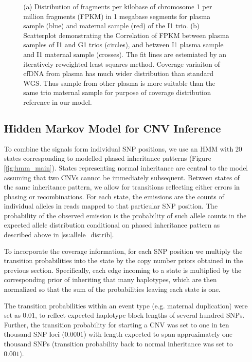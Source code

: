 \begin{figure}[h]
{\begin{minipage}[b]{0.45\textwidth}
	\end{minipage}	
}
	
\label{fig:fpkm}
\caption{(a) Distribution of fragments per kilobase of chromosome 1 per million fragments (FPKM) in 1 megabase segments for plasma sample (blue) and maternal sample (red) of the I1 trio. (b) Scatterplot demonstrating the Correlation of FPKM between plasma samples of I1 and G1 trios (circles), and between I1 plasma sample and I1 maternal sample (crosses). The fit lines are estemiated by an iteratively reweighted least squares method. Coverage variaiton of cfDNA from plasma has much wider distribution than standard WGS. Thus sample from other plasma is more suitable than the same trio maternal sample for purpose of coverage distribution reference in our model.  }\label{fig:fpkm}
\end{figure}

\subsection{Hidden Markov Model for CNV Inference}\label{ss:hmm}
To combine the signals form individual SNP positions, we use an HMM with 20 states corresponding to modelled phased inheritance patterns (Figure \ref{fig:hmm_main}). States representing normal inheritance are central to the model assuming that two CNVs cannot be immediately subsequent. Between states of the same inheritance pattern, we allow for transitions reflecting either errors in phasing or recombinations. For each state, the emissions are the counts of individual alleles in reads mapped to that particular SNP position. The probability of the observed emission is the probability of such allele counts in the expected allele distribution conditional on phased inheritance pattern as described above in \ref{ss:allele_distrib}.

To incorporate the coverage information, for each SNP position we multiply the transition probabilities into the state by the copy number priors obtained in the previous section. Specifically, each edge incoming to a state is multiplied by the corresponding prior of inheriting that many haplotypes, which are then normalized so that the sum of the probabilities leaving each state is one. %

The transition probabilities within an event type (e.g. maternal duplication) were set as $0.01$, to reflect expected haplotype block lengths of several hundred SNPs. Further, the transition probability for starting a CNV was set to one in ten thousand SNP loci ($0.0001$) with length expected to span approximately one thousand SNPs (transition probability back to normal inheritance was set to $0.001$).

